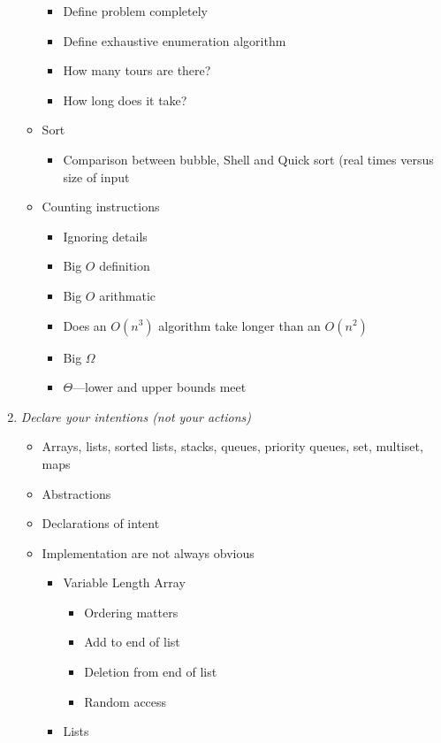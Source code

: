 \documentclass{article}
\begin{document}
\begin{enumerate}
\begin{itemize}
    \begin{itemize}
    \item Define problem completely
    \item Define exhaustive enumeration algorithm
    \item How many tours are there?
    \item How long does it take?
    \end{itemize}
  \item Sort
    \begin{itemize}
    \item Comparison between bubble, Shell and Quick sort (real times
      versus size of input
    \end{itemize}
  \item Counting instructions
    \begin{itemize}
    \item Ignoring details
    \item Big $O$ definition
    \item Big $O$ arithmatic
    \item Does an $O(n^3)$ algorithm take longer than an $O(n^2)$
    \item Big $\Omega$
    \item $\Theta$---lower and upper bounds meet
    \end{itemize}
  \end{itemize}
\item \emph{Declare your intentions (not your actions)}
  \begin{itemize}
  \item Arrays, lists, sorted lists, stacks, queues, priority queues,
  set, multiset, maps
  \item Abstractions
  \item Declarations of intent
  \item Implementation are not always obvious
    \begin{itemize}
    \item Variable Length Array
      \begin{itemize}
      \item Ordering matters
      \item Add to end of list
      \item Deletion from end of list
      \item Random access
      \end{itemize}
    \item Lists
      \begin{itemize}

\end{itemize}
\end{itemize}
\end{itemize}
\end{enumerate}
\end{document}
